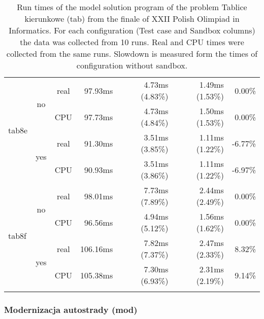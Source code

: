 \documentclass[en]{pracamgr}
\begin{document}
\begin{small}
\begin{longtable}{|l|c|c|r|r|r|r|}
\hline
\multirow{4}{*}{tab8e}    & \multirow{2}{*}{no}  & real & 97.93ms & 4.73ms (4.83\%) & 1.49ms (1.53\%) & 0.00\% \\*
                          &                      & CPU  & 97.73ms & 4.73ms (4.84\%) & 1.50ms (1.53\%) & 0.00\% \\*
                          \cline{2-7}
                          & \multirow{2}{*}{yes} & real & 91.30ms & 3.51ms (3.85\%) & 1.11ms (1.22\%) & -6.77\% \\*
                          &                      & CPU  & 90.93ms & 3.51ms (3.86\%) & 1.11ms (1.22\%) & -6.97\% \\
\hline
\multirow{4}{*}{tab8f}    & \multirow{2}{*}{no}  & real & 98.01ms & 7.73ms (7.89\%) & 2.44ms (2.49\%) & 0.00\% \\*
                          &                      & CPU  & 96.56ms & 4.94ms (5.12\%) & 1.56ms (1.62\%) & 0.00\% \\*
                          \cline{2-7}
                          & \multirow{2}{*}{yes} & real & 106.16ms & 7.82ms (7.37\%) & 2.47ms (2.33\%) & 8.32\% \\*
                          &                      & CPU  & 105.38ms & 7.30ms (6.93\%) & 2.31ms (2.19\%) & 9.14\% \\
\hline
\caption{Run times of the model solution program of the problem Tablice kierunkowe (tab) from the finale of XXII Polish Olimpiad in Informatics. For each configuration (Test case and Sandbox columns) the data was collected from 10 runs. Real and CPU times were collected from the same runs. Slowdown is measured form the times of configuration without sandbox.}
\label{table:tab_model_solution_runtimes}
\end{longtable}
\end{small}

\subsubsection{Modernizacja autostrady (mod)}
\end{document}
